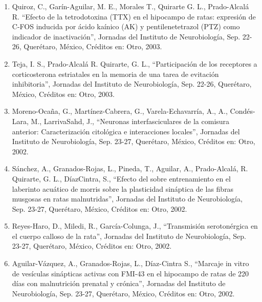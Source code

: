 \begin{enumerate}
\item Quiroz, C., Garín-Aguilar, M. E., Morales T., Quirarte G. L., Prado-Alcalá R. “Efecto de la tetrodotoxina (TTX) en el hipocampo de 
ratas: 
expresión de C-FOS inducida por ácido kaínico (AK) y pentilenetetrazol (PTZ) como indicador de inactivación”, Jornadas del Instituto de 
Neurobiología, Sep. 22-26, Querétaro, México, Créditos en: Otro, 2003.

\item Teja, I. S., Prado-Alcalá R. Quirarte, G. L., “Participación de los receptores a corticosterona estriatales en la memoria de una tarea 
de 
evitación inhibitoria”, Jornadas del Instituto de Neurobiología, Sep. 22-26, Querétaro, México, Créditos en: Otro, 2003.

\item Moreno-Ocaña, G., Martínez-Cabrera, G., Varela-Echavarría, A., A., Condés-Lara, M., LarrivaSahd, J., “Neuronas interfasciculares de la 
comisura anterior: Caracterización citológica e interacciones locales”, Jornadas del Instituto de Neurobiología, Sep. 23-27, Querétaro, 
México, Créditos en: Otro, 2002.

\item Sánchez, A., Granados-Rojas, L., Pineda, T., Aguilar, A., Prado-Alcalá, R. Quirarte, G. L., DíazCintra, S., “Efecto del sobre 
entrenamiento 
en el laberinto acuático de morris sobre la plasticidad sináptica de las fibras musgosas en ratas malnutridas”, Jornadas del Instituto de 
Neurobiología, Sep. 23-27, Querétaro, México, Créditos en: Otro, 2002.

\item Reyes-Haro, D., Miledi, R., García-Colunga, J., “Transmisión serotonérgica en el cuerpo calloso de la rata”, Jornadas del Instituto de 
Neurobiología, Sep. 23-27, Querétaro, México, Créditos en: Otro, 2002.

\item Aguilar-Vázquez, A., Granados-Rojas, L., Díaz-Cintra S., “Marcaje in vitro de vesículas sinápticas activas con FMI-43 en el hipocampo 
de 
ratas de 220 días con malnutrición prenatal y crónica”, Jornadas del Instituto de Neurobiología, Sep. 23-27, Querétaro, México, Créditos en: 
Otro, 2002.


\end{enumerate}

